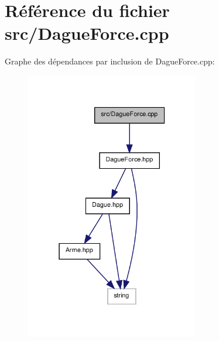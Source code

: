 \section{Référence du fichier src/\-Dague\-Force.cpp}
\label{_dague_force_8cpp}
Graphe des dépendances par inclusion de Dague\-Force.\-cpp\-:\nopagebreak
\begin{figure}[H]
\begin{center}
\leavevmode
\includegraphics[width=214pt]{_dague_force_8cpp__incl}
\end{center}
\end{figure}
